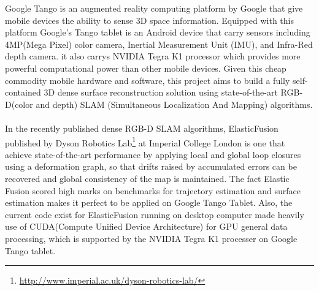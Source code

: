 \documentclass[12pt,twoside]{article}
\begin{document}
                                                                                                                                                                                                                                                                                                                                                                                                                                                                                                                                                                                                                                                                                                                                                                                                                                                                                                                                                                                                                                                                                                                                                                                                                                                                         Google Tango\cite{tango} is an augmented reality computing platform by Google that give mobile devices the ability to sense 3D space information. Equipped with this platform Google's Tango tablet is an Android device that carry sensors including 4MP(Mega Pixel) color camera, Inertial Measurement Unit (IMU), and Infra-Red depth camera. it also carrys NVIDIA Tegra K1 processor which provides more powerful computational power than other mobile devices. Given this cheap commodity mobile hardware and software, this project aims to build a fully self-contained 3D dense surface reconstruction solution using  state-of-the-art RGB-D(color and depth) SLAM (Simultaneous Localization And Mapping) algorithms.\\
\\
In the recently published dense RGB-D SLAM algorithms, ElasticFusion\cite{whelan2016elasticfusion} published by Dyson Robotics Lab\footnote{\url{http://www.imperial.ac.uk/dyson-robotics-lab/}} at Imperial College London is one that achieve state-of-the-art performance by applying local and global loop closures using a deformation graph, so that drifts raised by accumulated errors can be recovered and global consistency of the map is maintained. The fact Elastic Fusion scored high marks on benchmarks for trajectory estimation and surface estimation makes it perfect to be applied on Google Tango Tablet. Also, the current code exist for ElasticFusion running on desktop computer made heavily use of CUDA(Compute Unified Device Architecture) for GPU general data processing, which is supported by the NVIDIA Tegra K1 processer on Google Tango tablet.\\
\end{document}
